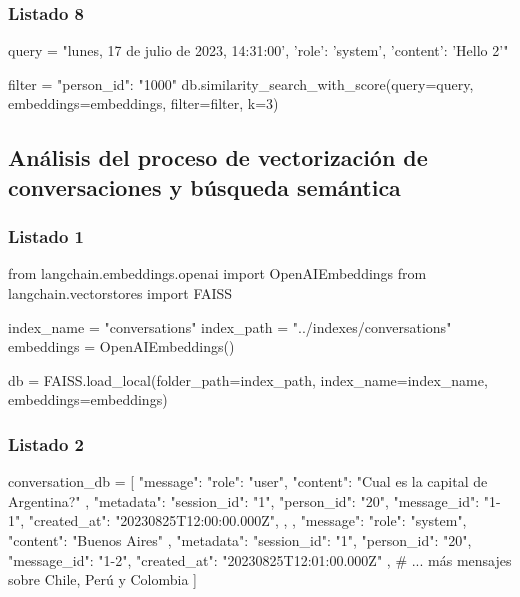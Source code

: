 \subsubsection{Listado 8}
\label{anexo:code-4-1-4-8}

\begin{APACode}
query = "lunes, 17 de julio de 2023, 14:31:00', 'role': 'system', 
         'content': 'Hello 2'"

filter = {"person_id": "1000"}
db.similarity_search_with_score(query=query, embeddings=embeddings, 
                                filter=filter, k=3)
\end{APACode}

\subsection{Análisis del proceso de vectorización de conversaciones y búsqueda semántica}

\subsubsection{Listado 1}
\label{anexo:code-4-1-5-1}

\begin{APACode}
from langchain.embeddings.openai import OpenAIEmbeddings
from langchain.vectorstores import FAISS

index_name = "conversations"
index_path = "../indexes/conversations"
embeddings = OpenAIEmbeddings()

db = FAISS.load_local(folder_path=index_path, index_name=index_name, 
                      embeddings=embeddings)
\end{APACode}

\subsubsection{Listado 2}
\label{anexo:code-4-1-5-2}

\begin{APACode}
conversation_db = [
    {
        "message": {
            "role": "user",
            "content": "Cual es la capital de Argentina?"
        },
        "metadata": {
            "session_id": "1",
            "person_id": "20",
            "message_id": "1-1",
            "created_at": "20230825T12:00:00.000Z",
        },
    },
    {
        "message": {
            "role": "system",
            "content": "Buenos Aires"
        },
        "metadata": {
            "session_id": "1",
            "person_id": "20",
            "message_id": "1-2",
            "created_at": "20230825T12:01:00.000Z"
        }
    },
    # ... más mensajes sobre Chile, Perú y Colombia
]
\end{APACode}

